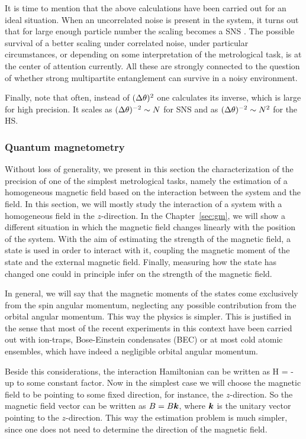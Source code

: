 It is time to mention that the above calculations have been carried out for an ideal situation.
When an uncorrelated noise is present in the system, it turns out that for large enough particle number the scaling becomes a SNS \citep{Demkowicz-Dobrzanski2012}.
The possible survival of a better scaling under correlated noise, under particular circumstances, or depending on some interpretation of the metrological task, is at the center of attention currently.
All these are strongly connected to the question of whether strong multipartite entanglement can survive in a noisy environment.

Finally, note that often, instead of $(\Delta \theta )^2$ one calculates its inverse, which is large for high precision.
It scales as $(\Delta \theta )^{-2}\sim N$ for SNS and as $(\Delta \theta )^{-2}\sim N^2$ for the HS.

\subsubsection{Quantum magnetometry}
\label{sec:bg-quantum-magnetometry}

Without loss of generality, we present in this section the characterization of the precision of one of the simplest metrological tasks, namely the estimation of a homogeneous magnetic field based on the interaction between the system and the field.
In this section, we will mostly study the interaction of a system with a homogeneous field in the $z$-direction.
In the Chapter~\ref{sec:gm}, we will show a different situation in which the magnetic field changes linearly with the position of the system.
With the aim of estimating the strength of the magnetic field, a state is used in order to interact with it, coupling the magnetic moment of the state and the external magnetic field.
Finally, measuring how the state has changed one could in principle infer on the strength of the magnetic field.

In general, we will say that the magnetic moments of the states come exclusively from the spin angular momentum, neglecting any possible contribution from the orbital angular momentum.
This way the physics is simpler.
This is justified in the sense that most of the recent experiments in this context have been carried out with ion-traps, Bose-Einstein condensates (BEC) or at most cold atomic ensembles, which have indeed a negligible orbital angular momentum.

Beside this considerations, the interaction Hamiltonian can be written as
\be
  H = - \bs{\mu} \cdot {}
\ee
up to some constant factor.
Now in the simplest case we will choose the magnetic field to be pointing to some fixed direction, for instance, the $z$-direction.
So the magnetic field vector can be written as ${B}=B\boldsymbol{k}$, where $\boldsymbol{k}$ is the unitary vector pointing to the $z$-direction.
This way the estimation problem is much simpler, since one does not need to determine the direction of the magnetic field.

